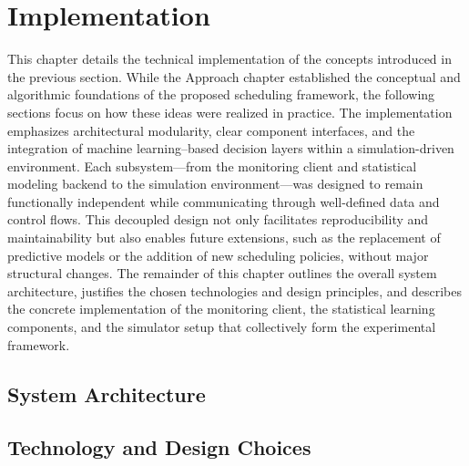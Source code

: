 \section{Implementation}
\label{cha:implementation}
This chapter details the technical implementation of the concepts introduced in the previous section. While the Approach chapter established the conceptual and algorithmic foundations of the proposed scheduling framework, the following sections focus on how these ideas were realized in practice. The implementation emphasizes architectural modularity, clear component interfaces, and the integration of machine learning–based decision layers within a simulation-driven environment. Each subsystem—from the monitoring client and statistical modeling backend to the simulation environment—was designed to remain functionally independent while communicating through well-defined data and control flows. This decoupled design not only facilitates reproducibility and maintainability but also enables future extensions, such as the replacement of predictive models or the addition of new scheduling policies, without major structural changes. The remainder of this chapter outlines the overall system architecture, justifies the chosen technologies and design principles, and describes the concrete implementation of the monitoring client, the statistical learning components, and the simulator setup that collectively form the experimental framework.

\subsection{System Architecture}
\label{sec:system_architecture}

\subsection{Technology and Design Choices}
\label{sec:technology_and_design_choices}

